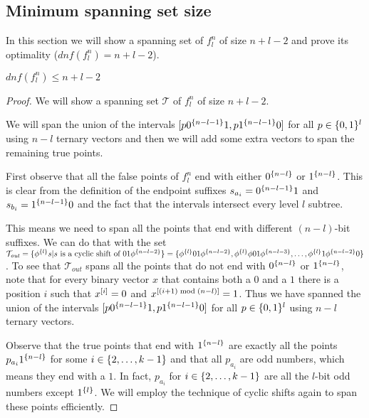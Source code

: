 \subsection{Minimum spanning set size}

In this section we will show a spanning set
of $f^n_l$ of size $n+l-2$
and prove its optimality
($dnf(f^n_l) = n+l-2$).

\begin{lemma}
$dnf(f_l^n) \leq n+l-2$
\end{lemma}

\begin{proof}
We will show a spanning set $\mathcal{T}$
of $f_l^n$ of size $n+l-2$.

We will span the union of the intervals
$[p 0^{\{n-l-1\}} 1, p 1^{\{n-l-1\}} 0]$
for all $p \in \{0, 1\}^l$
using $n-l$ ternary vectors
and then we will add some extra vectors
to span the remaining true points.

First observe that all the false points of $f_l^n$
end with either $0^{\{n-l\}}$ or $1^{\{n-l\}}$.
This is clear from the definition
of the  endpoint suffixes
$s_{a_i} = 0^{\{n-l-1\}} 1$
and $s_{b_i} = 1^{\{n-l-1\}} 0$
and the fact that the intervals intersect every
level $l$ subtree.

This means we need to span all the points that end
with different $(n-l)$-bit suffixes.
We can do that with the set
$\mathcal{T}_{\mathit{out}}
= \{\phi^{\{l\}} s
| s \text{ is a cyclic shift of } 01 \phi^{\{n-l-2\}}\}
= \{
\phi^{\{l\}} 01 \phi^{\{n-l-2\}},
\phi^{\{l\}} \phi 01 \phi^{\{n-l-3\}},
\ldots,
\phi^{\{l\}} 1 \phi^{\{n-l-2\}} 0
\}
$.
To see that $\mathcal{T}_{\mathit{out}}$
spans all the points
that do not end with $0^{\{n-l\}}$ or $1^{\{n-l\}}$,
note that for every binary vector $x$
that contains both a $0$ and a $1$
there is a position $i$
such that $x^{[i]} = 0$
and $x^{[(i+1) \bmod (n-l)]} = 1$.
Thus we have spanned the union of the intervals
$[p 0^{\{n-l-1\}} 1, p 1^{\{n-l-1\}} 0]$
for all $p \in \{0, 1\}^l$
using $n-l$ ternary vectors.

Observe that
the true points
that end with $1^{\{n-l\}}$
are exactly all the points $p_{a_i} 1^{\{n-l\}}$
for some $i \in \{2, \ldots, k-1\}$
and that all $p_{a_i}$ are odd numbers,
which means they end with a $1$.
In fact,
$p_{a_i}$ for $i \in \{2, \ldots, k-1\}$
are all the $l$-bit odd numbers except $1^{\{l\}}$.
We will employ the technique of cyclic shifts
again
to span these points efficiently.


\end{proof}
